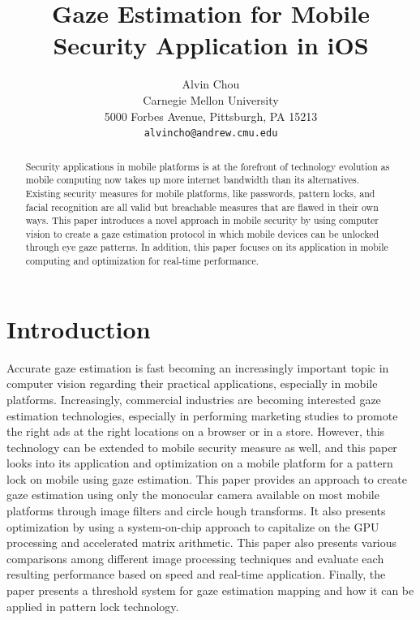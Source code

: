 \documentclass[10pt,twocolumn,letterpaper]{article}
\begin{document}
\title{Gaze Estimation for Mobile Security Application in iOS}

\author{Alvin Chou\\
Carnegie Mellon University\\
5000 Forbes Avenue, Pittsburgh, PA 15213\\
{\tt\small alvincho@andrew.cmu.edu}
}

\maketitle

\begin{abstract}
Security applications in mobile platforms is at the forefront of technology evolution as mobile computing now takes up more internet bandwidth than its alternatives.  Existing security measures for mobile platforms, like passwords, pattern locks, and facial recognition are all valid but breachable measures that are flawed in their own ways.  This paper introduces a novel approach in mobile security by using computer vision to create a gaze estimation protocol in which mobile devices can be unlocked through eye gaze patterns.  In addition, this paper focuses on its application in mobile computing and optimization for real-time performance.   
\end{abstract}

\section{Introduction}
Accurate gaze estimation is fast becoming an increasingly important topic in computer vision regarding their practical applications, especially in mobile platforms.  Increasingly, commercial industries are becoming interested gaze estimation technologies, especially in performing marketing studies to promote the right ads at the right locations on a browser or in a store.  However, this technology can be extended to mobile security measure as well, and this paper looks into its application and optimization on a mobile platform for a pattern lock on mobile using gaze estimation.  This paper provides an approach to create gaze estimation using only the monocular camera available on most mobile platforms through image filters and circle hough transforms. It also presents optimization by using a system-on-chip approach to capitalize on the GPU processing and accelerated matrix arithmetic.  This paper also presents various comparisons among different image processing techniques and evaluate each resulting performance based on speed and real-time application.  Finally, the paper presents a threshold system for gaze estimation mapping and how it can be applied in pattern lock technology. 
\end{document}
